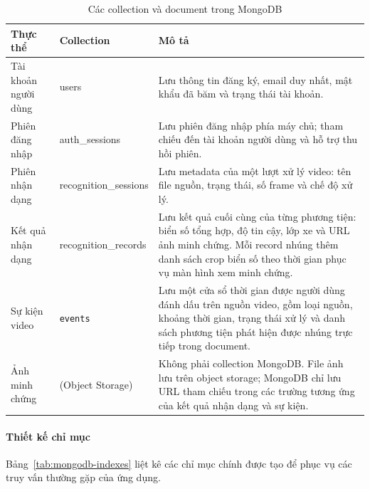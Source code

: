 \documentclass[../DoAn.tex]{subfiles}
\begin{document}
\begin{table}[htbp]
\centering
\caption{Các collection và document trong MongoDB}
\label{tab:mongodb-collections}
\renewcommand{\arraystretch}{1.15}
\begin{tabular}{|>{\raggedright\arraybackslash}p{3.2cm}|>{\raggedright\arraybackslash}p{3.2cm}|>{\raggedright\arraybackslash}p{7.8cm}|}
\hline
\textbf{Thực thể} & \textbf{Collection} & \textbf{Mô tả} \\
\hline
Tài khoản người dùng & users & Lưu thông tin đăng ký, email duy nhất, mật khẩu đã băm và trạng thái tài khoản. \\
\hline
Phiên đăng nhập & auth\_sessions & Lưu phiên đăng nhập phía máy chủ; tham chiếu đến tài khoản người dùng và hỗ trợ thu hồi phiên. \\
\hline
Phiên nhận dạng & recognition\_sessions & Lưu metadata của một lượt xử lý video: tên file nguồn, trạng thái, số frame và chế độ xử lý. \\
\hline
Kết quả nhận dạng & recognition\_records & Lưu kết quả cuối cùng của từng phương tiện: biển số tổng hợp, độ tin cậy, lớp xe và URL ảnh minh chứng. Mỗi record nhúng thêm danh sách crop biển số theo thời gian phục vụ màn hình xem minh chứng. \\
\hline
Sự kiện video & \texttt{events} & Lưu một cửa sổ thời gian được người dùng đánh dấu trên nguồn video, gồm loại nguồn, khoảng thời gian, trạng thái xử lý và danh sách phương tiện phát hiện được nhúng trực tiếp trong document. \\
\hline
Ảnh minh chứng & (Object Storage) & Không phải collection MongoDB. File ảnh lưu trên object storage; MongoDB chỉ lưu URL tham chiếu trong các trường tương ứng của kết quả nhận dạng và sự kiện. \\
\hline
\end{tabular}
\end{table}

\paragraph{Thiết kế chỉ mục}

Bảng~\ref{tab:mongodb-indexes} liệt kê các chỉ mục chính được tạo để phục vụ các truy vấn thường gặp của ứng dụng.
\end{document}
